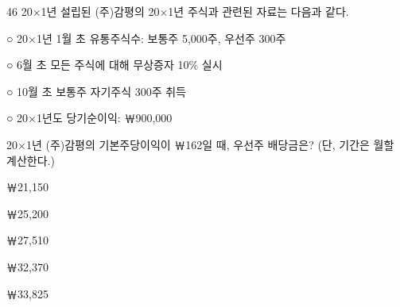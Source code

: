\begin{question}{46}
20×1년 설립된 (주)감평의 20×1년 주식과 관련된 자료는 다음과 같다.
\begin{framedtext}
○ 20×1년 1월 초 유통주식수: 보통주 5,000주, 우선주 300주 \par
○ 6월 초 모든 주식에 대해 무상증자 10\% 실시 \par
○ 10월 초 보통주 자기주식 300주 취득 \par
○ 20×1년도 당기순이익: ￦900,000 \par
\end{framedtext}
20×1년 (주)감평의 기본주당이익이 ￦162일 때, 우선주 배당금은? (단, 기간은 월할 계산한다.)
\begin{choices}
  \item ￦21,150
  \item ￦25,200
  \item ￦27,510
  \item ￦32,370
  \item ￦33,825
\end{choices}
\end{question}
